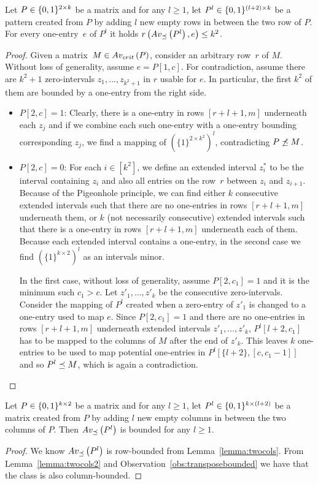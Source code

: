 \begin{lemma}
\label{lemma:twocols2}
Let $P\in\{0,1\}^{2\times k}$ be a matrix and for any $l\geq1$, let $P^l\in\{0,1\}^{(l+2)\times k}$ be a pattern created from $P$ by adding $l$ new empty rows in between the two row of $P$. For every one-entry~$e$ of $P^l$ it holds $r\left(Av_{\preceq}\left(P^l\right),e\right)\leq k^2$.
\end{lemma}
\begin{proof}
Given a matrix~$M\in Av_{crit}\left(P\right)$, consider an arbitrary row~$r$ of $M$. Without loss of generality, assume $e=P[1,c]$. For contradiction, assume there are $k^2+1$ zero-intervals $z_1,\dots,z_{k^2+1}$ in $r$ usable for $e$. In particular, the first $k^2$ of them are bounded by a one-entry from the right side.
\begin{itemize}
	\item $P[2,c]=1$: Clearly, there is a one-entry in rows $[r+l+1,m]$ underneath each $z_j$ and if we combine each such one-entry with a one-entry bounding corresponding $z_j$, we find a mapping of $\left(\{1\}^{2\times k^2}\right)^l$, contradicting $P\not\preceq M$.
	\item $P[2,c]=0$: For each $i\in[k^2]$, we define an extended interval $z^*_i$ to be the interval containing $z_i$ and also all entries on the row~$r$ between $z_i$ and $z_{i+1}$. Because of the Pigeonhole principle, we can find either $k$ consecutive extended intervals such that there are no one-entries in rows $[r+l+1,m]$ underneath them, or $k$ (not necessarily consecutive) extended intervals such that there is a one-entry in rows $[r+l+1,m]$ underneath each of them. Because each extended interval contains a one-entry, in the second case we find $\left(\{1\}^{k\times2}\right)^l$ as an intervals minor.
	
	In the first case, without loss of generality, assume $P[2,c_1]=1$ and it is the minimum such $c_1>c$. Let $z'_1,\dots,z'_k$ be the consecutive zero-intervals. Consider the mapping of $P^l$ created when a zero-entry of $z'_1$ is changed to a one-entry used to map $e$. Since $P[2,c_1]=1$ and there are no one-entries in rows $[r+l+1,m]$ underneath extended intervals $z'_1,\dots,z'_k$, $P^l[l+2,c_1]$ has to be mapped to the columns of $M$ after the end of $z'_k$. This leaves $k$ one-entries to be used to map potential one-entries in $P^l[\{l+2\},[c,c_1-1]]$ and so $P^l\preceq M$, which is again a contradiction. \qedhere
\end{itemize}
\end{proof}

\begin{cor}
\label{cor:twocols}
Let $P\in\{0,1\}^{k\times2}$ be a matrix and for any $l\geq1$, let $P^l\in\{0,1\}^{k\times(l+2)}$ be a matrix created from $P$ by adding $l$ new empty columns in between the two columns of $P$. Then $Av_{\preceq}\left(P^l\right)$ is bounded for any $l\geq1$.
\end{cor}
\begin{proof}
We know $Av_{\preceq}\left(P^l\right)$ is row-bounded from Lemma~\ref{lemma:twocols}. From Lemma~\ref{lemma:twocols2} and Observation~\ref{obs:transposebounded} we have that the class is also column-bounded.
\end{proof}

